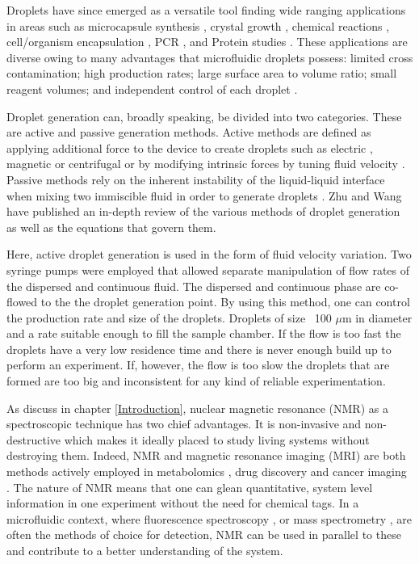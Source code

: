 Droplets have since emerged as a versatile tool finding wide ranging applications in areas
such as microcapsule synthesis \citep{RN105}, crystal growth \citep{RN106}, chemical reactions
\citep{RN114}, cell/organism encapsulation \citep{RN107,RN108, RN113}, PCR \citep{RN109,
RN110}, and Protein studies \citep{RN111, RN112}. These applications are diverse owing to many
advantages that microfluidic droplets possess: limited cross contamination; high production
rates; large surface area to volume ratio; small reagent volumes; and independent control of
each droplet \citep{RN102}.

Droplet generation can, broadly speaking, be divided into two categories. These are active
and passive generation methods. Active methods are defined as applying additional force to
the device to create droplets such as electric \citep{RN116}, magnetic \citep{RN117} or
centrifugal \citep{RN11} or by modifying intrinsic forces by tuning fluid
velocity \citep{RN58}. Passive methods rely on the inherent instability of the liquid-liquid
interface when mixing two immiscible fluid in order to generate droplets \citep{RN120, RN121,
RN122}. Zhu and Wang \citep{RN123} have published an in-depth review of the various methods of
droplet generation as well as the equations that govern them.

Here, active droplet generation is used in the form of fluid velocity variation. Two
syringe pumps were employed that allowed separate manipulation of flow rates of the dispersed
and continuous fluid. The dispersed and continuous phase are co-flowed to the the droplet
generation point. By using this method, one can control the production rate and size of the
droplets. Droplets of size ~100 $\mu\text{m}$ in diameter and a rate suitable enough to fill
the sample chamber. If the flow is too fast the droplets have a very low residence time and
there is never enough build up to perform an experiment. If, however, the flow is too slow
the droplets that are formed are too big and inconsistent for any kind of reliable
experimentation.

As discuss in chapter \ref{Introduction}, nuclear magnetic resonance (NMR) as a spectroscopic technique has two chief advantages. It is
non-invasive and non-destructive which makes it ideally placed to study living systems without
destroying them. Indeed, NMR and magnetic resonance imaging (MRI) are both methods actively
employed in metabolomics \citep{RN124}, drug discovery \citep{RN125} and cancer
imaging \citep{RN126}. The nature of NMR means that one can glean quantitative, system
level information in one experiment without the need for chemical tags. In a microfluidic
context, where fluorescence spectroscopy \citep{horrocks2015fast, schlimpert2016fluorescence}, or
mass spectrometry \citep{redman2016characterization,choi2016digital}, are often the methods of choice
for detection, NMR can be used in parallel to these and contribute to a better understanding of the system.

